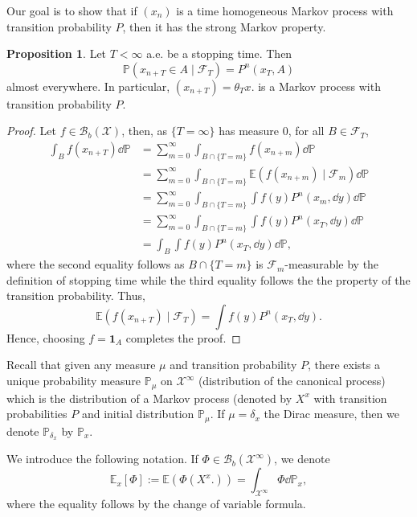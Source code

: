 \documentclass[]{article}
\theoremstyle{definition}
\theoremstyle{definition}
\newtheorem{proposition}{Proposition}[section]
\begin{document}
Our goal is to show that if \((x_n)\) is a time homogeneous Markov process with 
transition probability \(P\), then it has the strong Markov property.

\begin{proposition}
  Let \(T < \infty\) a.e. be a stopping time. Then 
  \[\mathbb{P}(x_{n + T} \in A \mid \mathcal{F}_T) = P^n(x_T, A)\]
  almost everywhere. In particular, \((x_{n + T})= \theta_T x.\) is a Markov process 
  with transition probability \(P\).
\end{proposition}
\begin{proof}
  Let \(f \in \mathcal{B}_b(\mathcal{X})\), then, as \(\{T = \infty\}\) has measure 0, 
  for all \(B \in \mathcal{F}_T\),
  \[\begin{split}
    \int_B f(x_{n + T}) \dd \mathbb{P} & = \sum_{m = 0}^\infty \int_{B \cap \{T = m\}} f(x_{n + m}) \dd \mathbb{P} \\
    & = \sum_{m = 0}^\infty \int_{B \cap \{T = m\}} \mathbb{E}(f(x_{n + m}) \mid \mathcal{F}_m) \dd \mathbb{P}\\
    & = \sum_{m = 0}^\infty \int_{B \cap \{T = m\}}  \int f(y)P^n(x_m, \dd y) \dd \mathbb{P}\\
    & = \sum_{m = 0}^\infty \int_{B \cap \{T = m\}}  \int f(y)P^n(x_T, \dd y) \dd \mathbb{P}\\
    & = \int_B \int f(y) P^n(x_T, \dd y) \dd \mathbb{P},
  \end{split}\]
  where the second equality follows as \(B \cap \{T = m\}\) is \(\mathcal{F}_m\)-measurable 
  by the definition of stopping time while the third equality follows the the property 
  of the transition probability. Thus, 
  \[\mathbb{E}(f(x_{n + T}) \mid \mathcal{F}_T) = \int f(y) P^n(x_T, \dd y).\]
  Hence, choosing \(f = \mathbf{1}_A\) completes the proof.
\end{proof}

Recall that given any measure \(\mu\) and transition probability \(P\), there exists 
a unique probability measure \(\mathbb{P}_\mu\) on \(\mathcal{X}^\infty\) 
(distribution of the canonical process) 
which is the distribution of a Markov process (denoted by \(X^x\) with transition 
probabilities \(P\) and initial distribution \(\mathbb{P}_\mu\). If \(\mu = \delta_x\) 
the Dirac measure, then we denote \(\mathbb{P}_{\delta_x}\) by \(\mathbb{P}_x\).

We introduce the following notation. If \(\Phi \in \mathcal{B}_b(\mathcal{X}^\infty)\),
we denote 
\[\mathbb{E}_x[\Phi] := \mathbb{E}(\Phi(X^x.)) = \int_{\mathcal{X}^\infty} \Phi \dd \mathbb{P}_x,\]
where the equality follows by the change of variable formula. 
\end{document}
